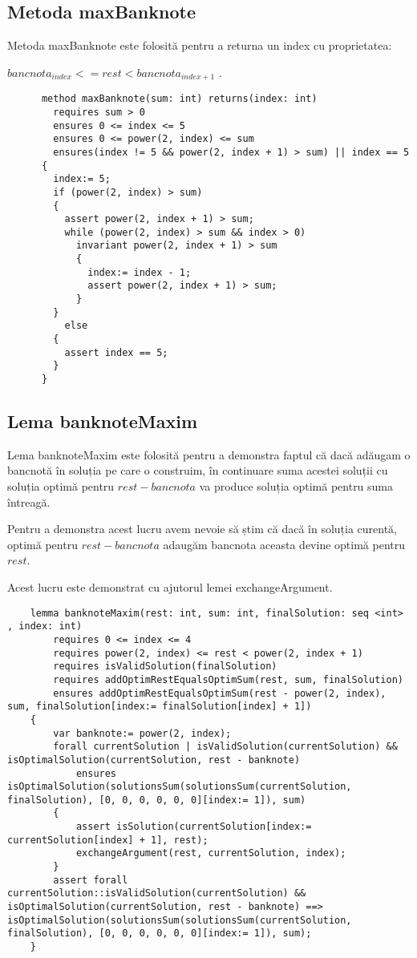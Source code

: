     \subsection{Metoda maxBanknote}
    Metoda maxBanknote este folosită pentru a returna un index cu proprietatea: \par
     $bancnota_{index} <= rest < bancnota_{index + 1}$  .\par
    \begin{lstlisting}
      method maxBanknote(sum: int) returns(index: int)
        requires sum > 0
        ensures 0 <= index <= 5
        ensures 0 <= power(2, index) <= sum
        ensures(index != 5 && power(2, index + 1) > sum) || index == 5 
      {
        index:= 5;
        if (power(2, index) > sum) 
        {
          assert power(2, index + 1) > sum;
          while (power(2, index) > sum && index > 0)
            invariant power(2, index + 1) > sum 
            {
              index:= index - 1;
              assert power(2, index + 1) > sum;
            }
        } 
          else 
        {
          assert index == 5;
        }
      }
    \end{lstlisting}


    \subsection{Lema banknoteMaxim}
    Lema banknoteMaxim este folosită pentru a demonstra faptul că dacă adăugam o bancnotă în soluția pe care o 
    construim, în continuare suma acestei soluții cu soluția optimă pentru $ rest - bancnota$ va produce soluția 
    optimă pentru suma întreagă.\par
    Pentru a demonstra acest lucru avem nevoie să știm că dacă în soluția curentă, optimă pentru $ rest - bancnota$  
    adaugăm bancnota aceasta devine optimă pentru $rest$.\par
    Acest lucru este demonstrat cu ajutorul lemei exchangeArgument.
    \begin{lstlisting}
    lemma banknoteMaxim(rest: int, sum: int, finalSolution: seq <int> , index: int)
        requires 0 <= index <= 4
        requires power(2, index) <= rest < power(2, index + 1)
        requires isValidSolution(finalSolution)
        requires addOptimRestEqualsOptimSum(rest, sum, finalSolution)
        ensures addOptimRestEqualsOptimSum(rest - power(2, index), sum, finalSolution[index:= finalSolution[index] + 1]) 
    {
        var banknote:= power(2, index);
        forall currentSolution | isValidSolution(currentSolution) && isOptimalSolution(currentSolution, rest - banknote)
            ensures isOptimalSolution(solutionsSum(solutionsSum(currentSolution, finalSolution), [0, 0, 0, 0, 0, 0][index:= 1]), sum) 
        {
            assert isSolution(currentSolution[index:= currentSolution[index] + 1], rest);
            exchangeArgument(rest, currentSolution, index);
        }
        assert forall currentSolution::isValidSolution(currentSolution) && isOptimalSolution(currentSolution, rest - banknote) ==> isOptimalSolution(solutionsSum(solutionsSum(currentSolution, finalSolution), [0, 0, 0, 0, 0, 0][index:= 1]), sum);
    }
    \end{lstlisting}

